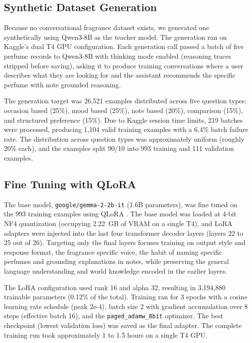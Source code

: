 \documentclass[11pt,a4paper]{article}
\begin{document}
\subsection{Synthetic Dataset Generation}

Because no conversational fragrance dataset exists, we generated one synthetically using Qwen3-8B \citep{qwen2025} as the teacher model. The generation ran on Kaggle's dual T4 GPU configuration. Each generation call passed a batch of five perfume records to Qwen3-8B with thinking mode enabled (reasoning traces stripped before saving), asking it to produce training conversations where a user describes what they are looking for and the assistant recommends the specific perfume with note grounded reasoning.

The generation target was 26,521 examples distributed across five question types: occasion based (25\%), mood based (25\%), note based (20\%), comparison (15\%), and structured preference (15\%). Due to Kaggle session time limits, 219 batches were processed, producing 1,104 valid training examples with a 6.4\% batch failure rate. The distribution across question types was approximately uniform (roughly 20\% each), and the examples split 90/10 into 993 training and 111 validation examples.

\subsection{Fine Tuning with QLoRA}

The base model, \texttt{google/gemma-2-2b-it} (1.6B parameters), was fine tuned on the 993 training examples using QLoRA \citep{dettmers2023qlora}. The base model was loaded at 4-bit NF4 quantization (occupying 2.22~GB of VRAM on a single T4), and LoRA adapters were injected into the last four transformer decoder layers (layers 22 to 25 out of 26). Targeting only the final layers focuses training on output style and response format, the fragrance specific voice, the habit of naming specific perfumes and grounding explanations in notes, while preserving the general language understanding and world knowledge encoded in the earlier layers.

The LoRA configuration used rank 16 and alpha 32, resulting in 3,194,880 trainable parameters (0.12\% of the total). Training ran for 3 epochs with a cosine learning rate schedule (peak 2e-4), batch size 2 with gradient accumulation over 8 steps (effective batch 16), and the \texttt{paged\_adamw\_8bit} optimizer. The best checkpoint (lowest validation loss) was saved as the final adapter. The complete training run took approximately 1 to 1.5 hours on a single T4 GPU.
\end{document}
